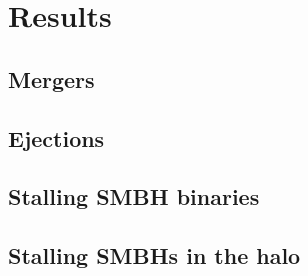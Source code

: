 \section{Results}

\subsection{Mergers}

\subsection{Ejections}

\subsection{Stalling SMBH binaries}

\subsection{Stalling SMBHs in the halo}

